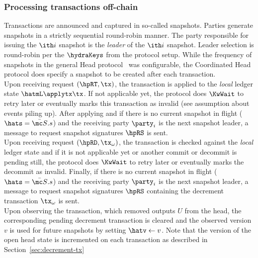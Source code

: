 \subsubsection{Processing transactions off-chain}

Transactions are announced and captured in so-called snapshots. Parties generate
snapshots in a strictly sequential round-robin manner. The party responsible for
issuing the $\ith i$ snapshot is the \emph{leader} of the $\ith i$ snapshot.
Leader selection is round-robin per the $\hydraKeys$ from the protocol setup.
While the frequency of snapshots in the general Head protocol~\cite{hydrahead20}
was configurable, the Coordinated Head protocol does specify a snapshot to be
created after each transaction.\\

\quad Upon receiving request $(\hpRT,\tx)$, the transaction is
applied to the \emph{local} ledger state $\hatmL \applytx \tx$. If not
applicable yet, the protocol does $\KwWait$ to retry later or eventually marks
this transaction as invalid (see assumption about events piling up). After
applying and if there is no current snapshot in flight ($\hats = \bar{\mc S}.s$) and the
receiving party $\party_{i}$ is the next snapshot
leader, a message to request snapshot signatures $\hpRS$ is sent. \\

\quad Upon receiving request $(\hpRD,\tx_\omega)$, the transaction is
checked against the \emph{local} ledger state and if it is not applicable yet or another
commit or decommit is pending still, the protocol does $\KwWait$ to retry later or
eventually marks the decommit as invalid.  Finally, if there is no current snapshot in flight
($\hats = \bar{\mc S}.s$) and the receiving party $\party_{i}$ is the next
snapshot leader, a message to request snapshot signatures $\hpRS$ containing
the decrement transaction $\tx_\omega$ is sent. \\

\quad Upon observing the \mtxDecrement{}
transaction, which removed outputs $U$ from the head, the corresponding
pending decrement transaction is cleared and the observed version $v$ is used for future
snapshots by setting $\hatv \gets v$.  Note that the version of the open head state
is incremented on each \mtxDecrement{} transaction as described in Section~\ref{sec:decrement-tx}
 \\

